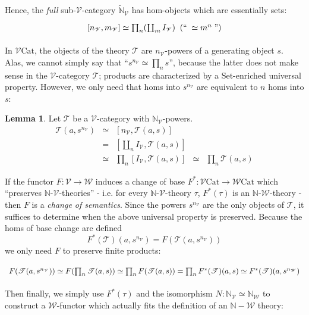 \documentclass[a4paper,UKenglish]{article}
\theoremstyle{definition}
\newtheorem{lemma}[theorem]{Lemma}
\newcommand{\Set}{\mathrm{Set}}
\newcommand{\Cat}{\mathrm{Cat}}
\newcommand{\NN}{\mathbb{N}}
\newcommand{\V}{\mathscr{V}}
\newcommand{\W}{\mathscr{W}}
\newcommand{\T}{\mathscr{T}}
\begin{document}
Hence, the \textit{full} sub-$\V$-category $\tilde{\NN}_\V$ has hom-objects which are essentially sets:
\[\begin{tikzcd}
\left[n_\V,m_\V\right] \simeq \prod_n (\coprod_m I_\V) \;\; (`` \; \simeq m^n \;")
\end{tikzcd}\]

In $\V\Cat$, the objects of the theory $\T$ are $n_\V$-powers of a generating object $s$. Alas, we cannot simply say that ``$s^{n_\V} \simeq \prod_n s$'', because the latter does not make sense in the $\V$-category $\T$; products are characterized by a $\Set$-enriched universal property. However, we only need that homs into $s^{n_\V}$ are equivalent to $n$ homs into $s$:

\begin{lemma}
	Let $\T$ be a $\V$-category with $\NN_\V$-powers.
	\[\begin{array}{rclcl}
	\T(a,s^{n_\V}) & \simeq & [n_\V,\T(a,s)] & &\\
	& = & [\coprod_n I_\V,\T(a,s)] & &\\
	& \simeq & \prod_n [I_\V,\T(a,s)] & \simeq & \prod_n \T(a,s)
	\end{array}\]
\end{lemma}

If the functor $F:\V \to \W$ induces a change of base $F^*:\V\Cat \to \W\Cat$ which ``preserves $\NN$-$\V$-theories'' - i.e. for every $\NN$-$\V$-theory $\tau$, $F^*(\tau)$ is an $\NN$-$\W$-theory - then $F$ is a \textit{change of semantics}. Since the powers $s^{n_\V}$ are the only objects of $\T$, it suffices to determine when the above universal property is preserved. Because the homs of base change are defined $$F^*(\T)(a,s^{n_\V}) = F(\T(a,s^{n_\V}))$$ we only need $F$ to preserve finite products:

\[\begin{tikzcd}
F(\T(a,s^{n_\V})) \simeq F(\prod_n \T(a,s)) \simeq \prod_n F(\T(a,s)) = \prod_n F^*(\T)(a,s) \simeq F^*(\T)(a,s^{n_\W})
\end{tikzcd}\]

Then finally, we simply use $F^*(\tau)$ and the isomorphism $N: \NN_\V \simeq \NN_\W$ to construct a $\W$-functor which actually fits the definition of an $\NN-\W$ theory:
\end{document}
